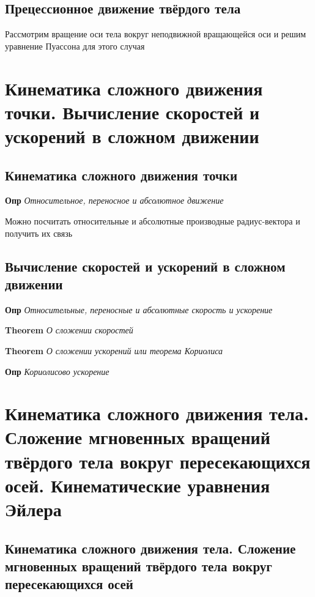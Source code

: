 \documentclass[a4paper, 14pt]{article}
\begin{document}
    \subsection{Прецессионное движение твёрдого тела}
    
    Рассмотрим вращение оси тела вокруг неподвижной вращающейся оси и решим уравнение Пуассона для этого случая
    
    \section{Кинематика сложного движения точки.
    Вычисление скоростей и ускорений в сложном движении}
    
        \subsection{Кинематика сложного движения точки}

    \textbf{Опр} \textit{Относительное, переносное и абсолютное движение}
    
    Можно посчитать относительные и абсолютные производные радиус-вектора и получить их связь

    \subsection{Вычисление скоростей и ускорений в сложном движении}

    \textbf{Опр} \textit{Относительные, переносные и абсолютные скорость и ускорение}
    
    \textbf{Theorem} \textit{О сложении скоростей}

    \textbf{Theorem} \textit{О сложении ускорений или теорема Кориолиса}
    
    \textbf{Опр} \textit{Кориолисово ускорение}
    
    \section{Кинематика сложного движения тела.
    Сложение мгновенных вращений твёрдого тела вокруг пересекающихся осей.
    Кинематические уравнения Эйлера}
    
    \subsection{Кинематика сложного движения тела. Сложение мгновенных вращений твёрдого тела вокруг пересекающихся
    осей}
    
\end{document}

